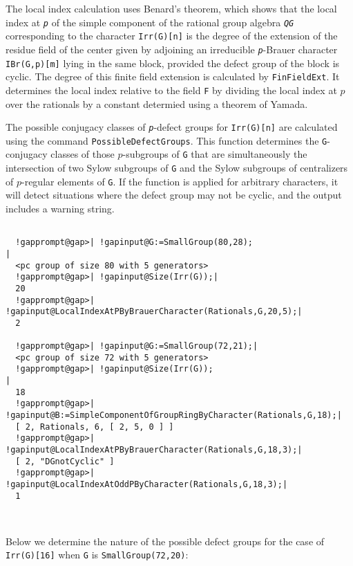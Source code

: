 \documentclass[a4paper,11pt]{report}
\begin{document}
{{{ The local index calculation uses Benard's theorem, which shows that the local
index at \mbox{\texttt{\mdseries\slshape p}} of the simple component of the rational group algebra \mbox{\texttt{\mdseries\slshape QG}} corresponding to the character \texttt{Irr(G)[n]} is the degree of the extension of the residue field of the center given by
adjoining an irreducible \mbox{\texttt{\mdseries\slshape p}}-Brauer character \texttt{IBr(G,p)[m]} lying in the same block, provided the defect group of the block is cyclic. The
degree of this finite field extension is calculated by \texttt{FinFieldExt}. It determines the local index relative to the field \texttt{F} by dividing the local index at $p$ over the rationals by a constant determied using a theorem of Yamada. 

 The possible conjugacy classes of \mbox{\texttt{\mdseries\slshape p}}-defect groups for \texttt{Irr(G)[n]} are calculated using the command \texttt{PossibleDefectGroups}. This function determines the \texttt{G}-conjugacy classes of those $p$-subgroups of \texttt{G} that are simultaneously the intersection of two Sylow subgroups of \texttt{G} and the Sylow subgroups of centralizers of $p$-regular elements of \texttt{G}. If the function is applied for arbitrary characters, it will detect
situations where the defect group may not be cyclic, and the output includes a
warning string. 
\begin{Verbatim}[commandchars=!@|,fontsize=\small,frame=single,label=Example]
  
  !gapprompt@gap>| !gapinput@G:=SmallGroup(80,28);                                 |
  <pc group of size 80 with 5 generators>
  !gapprompt@gap>| !gapinput@Size(Irr(G));|
  20
  !gapprompt@gap>| !gapinput@LocalIndexAtPByBrauerCharacter(Rationals,G,20,5);|
  2 
  
  !gapprompt@gap>| !gapinput@G:=SmallGroup(72,21);|
  <pc group of size 72 with 5 generators>
  !gapprompt@gap>| !gapinput@Size(Irr(G));                                            |
  18
  !gapprompt@gap>| !gapinput@B:=SimpleComponentOfGroupRingByCharacter(Rationals,G,18);|
  [ 2, Rationals, 6, [ 2, 5, 0 ] ]
  !gapprompt@gap>| !gapinput@LocalIndexAtPByBrauerCharacter(Rationals,G,18,3);|
  [ 2, "DGnotCyclic" ]
  !gapprompt@gap>| !gapinput@LocalIndexAtOddPByCharacter(Rationals,G,18,3);|
  1
  
  
\end{Verbatim}
 Below we determine the nature of the possible defect groups for the case of \texttt{Irr(G)[16]} when \texttt{G} is \texttt{SmallGroup(72,20)}: 
\begin{Verbatim}[commandchars=!@|,fontsize=\small,frame=single,label=Example]
  

\end{Verbatim}}}}
\end{document}

